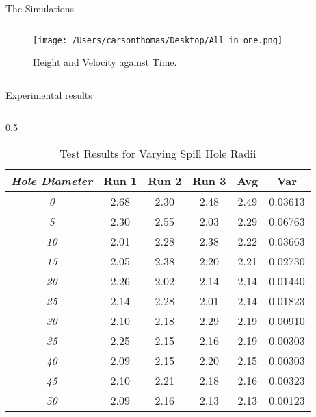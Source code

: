 \documentclass[final]{beamer}
\newlength{\colwidth}
\begin{document}
\begin{frame}[t]
\begin{columns}[t]
\begin{column}{\colwidth}
\begin{block}{The Simulations}
\begin{columns}
    \begin{column}{0.5\textwidth}  %
        \begin{figure}
            \centering
            \texttt{[image: /Users/carsonthomas/Desktop/All\_in\_one.png]} %
            \caption{Height and Velocity against Time.}
            \label{fig:example}
        \end{figure}
    \end{column}

\end{columns}

\end{block}


  \begin{block}{Experimental results}
\begin{columns}[t]
\hspace{20pt} %
\begin{column}{0.5\colwidth}
\begin{table}[h!]
    \centering
    \begin{tabular}{>{\itshape}c c c c c c}
        \toprule
        Hole Diameter & Run 1 & Run 2 & Run 3 & Avg & Var \\
        \midrule
        0  & 2.68 & 2.30 & 2.48 & 2.49 & 0.03613 \\
        5  & 2.30 & 2.55 & 2.03 & 2.29 & 0.06763 \\
        10 & 2.01 & 2.28 & 2.38 & 2.22 & 0.03663 \\
        15 & 2.05 & 2.38 & 2.20 & 2.21 & 0.02730 \\
        20 & 2.26 & 2.02 & 2.14 & 2.14 & 0.01440 \\
        25 & 2.14 & 2.28 & 2.01 & 2.14 & 0.01823 \\
        30 & 2.10 & 2.18 & 2.29 & 2.19 & 0.00910 \\
        35 & 2.25 & 2.15 & 2.16 & 2.19 & 0.00303 \\
        40 & 2.09 & 2.15 & 2.20 & 2.15 & 0.00303 \\
        45 & 2.10 & 2.21 & 2.18 & 2.16 & 0.00323 \\
        50 & 2.09 & 2.16 & 2.13 & 2.13 & 0.00123 \\
        \bottomrule
    \end{tabular}
    \caption{Test Results for Varying Spill Hole Radii}
    \label{tab:test_results_variance}
\end{table}


\end{column}
\end{columns}
\end{block}
\end{column}
\end{columns}
\end{frame}
\end{document}
